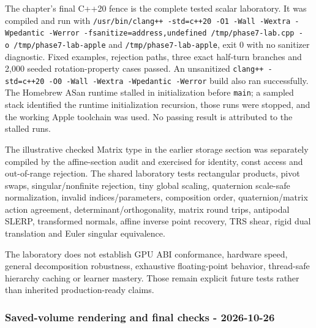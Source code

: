 \hypertarget{appendix-a103e7846d21-executable-verification-and-limits}{}

The chapter's final C++20 fence is the complete tested scalar laboratory. It was compiled and run with \texttt{/usr/bin/clang++\ -std=c++20\ -O1\ -Wall\ -Wextra\ -Wpedantic\ -Werror\ -fsanitize=address,undefined\ /tmp/phase7-lab.cpp\ -o\ /tmp/phase7-lab-apple} and \texttt{/tmp/phase7-lab-apple}, exit 0 with no sanitizer diagnostic. Fixed examples, rejection paths, three exact half-turn branches and 2,000 seeded rotation-property cases passed. An unsanitized \texttt{clang++\ -std=c++20\ -O0\ -Wall\ -Wextra\ -Wpedantic\ -Werror} build also ran successfully. The Homebrew ASan runtime stalled in initialization before \texttt{main}; a sampled stack identified the runtime initialization recursion, those runs were stopped, and the working Apple toolchain was used. No passing result is attributed to the stalled runs.

The illustrative checked Matrix type in the earlier storage section was separately compiled by the affine-section audit and exercised for identity, const access and out-of-range rejection. The shared laboratory tests rectangular products, pivot swaps, singular/nonfinite rejection, tiny global scaling, quaternion scale-safe normalization, invalid indices/parameters, composition order, quaternion/matrix action agreement, determinant/orthogonality, matrix round trips, antipodal SLERP, transformed normals, affine inverse point recovery, TRS shear, rigid dual translation and Euler singular equivalence.

The laboratory does not establish GPU ABI conformance, hardware speed, general decomposition robustness, exhaustive floating-point behavior, thread-safe hierarchy caching or learner mastery. Those remain explicit future tests rather than inherited production-ready claims.

\subsubsection{Saved-volume rendering and final checks - 2026-10-26}\label{appendix-a103e7846d21-saved-volume-rendering-and-final-checks---2026-10-26}

\hypertarget{appendix-a103e7846d21-saved-volume-rendering-and-final-checks---2026-10-26}{}

